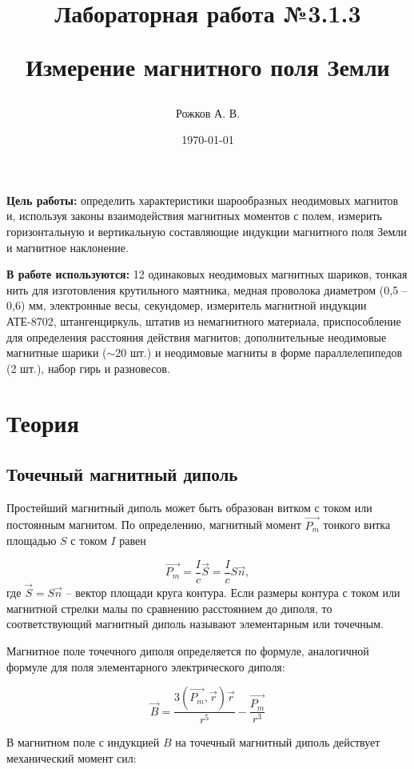 \documentclass[a4paper, 12pt]{article}
\title{\begin{center}Лабораторная работа №3.1.3\end{center}
Измерение магнитного поля Земли}
\author{Рожков А. В.}
\date{\today}
\begin{document}
    \maketitle
    \newpage

    \textbf{Цель работы:} определить характеристики шарообразных неодимовых магнитов и, используя законы взаимодействия магнитных моментов с полем, измерить горизонтальную и вертикальную составляющие индукции магнитного поля Земли и магнитное наклонение.

	\textbf{В работе используются:} 12 одинаковых неодимовых магнитных шариков, тонкая нить для изготовления крутильного маятника, медная проволока диаметром (0,5 – 0,6) мм, электронные весы, секундомер, измеритель магнитной индукции АТЕ-8702, штангенциркуль, штатив из немагнитного материала, приспособление для определения расстояния действия магнитов; дополнительные неодимовые магнитные шарики ($\sim$20 шт.) и неодимовые магниты в форме параллелепипедов (2 шт.), набор гирь и разновесов.

    \section{Теория}
        \subsection{Точечный магнитный диполь}
            Простейший магнитный диполь может быть образован витком с током или постоянным магнитом. По определению, магнитный момент $\overrightarrow{P_m}$ тонкого витка площадью $S$ с током $I$ равен

            $$
            \overrightarrow{P_m}=\dfrac{I}{c}\vec{S}=\dfrac{I}{c}S\vec{n},
            $$
            где $\vec{S}=S\vec{n}$ -- вектор площади круга контура. Если размеры контура с током или магнитной стрелки малы по сравнению расстоянием до диполя, то соответствующий магнитный диполь называют элементарным или точечным.

            Магнитное поле точечного диполя определяется по формуле, аналогичной формуле для поля элементарного электрического диполя:

            $$
            \vec{B}=\dfrac{3(\overrightarrow{P_m},\vec{r})\vec{r}}{r^5} - \dfrac{\overrightarrow{P_m}}{r^3}
            $$

            В магнитном поле с индукцией $B$ на точечный магнитный диполь действует механический момент сил:
\end{document}
